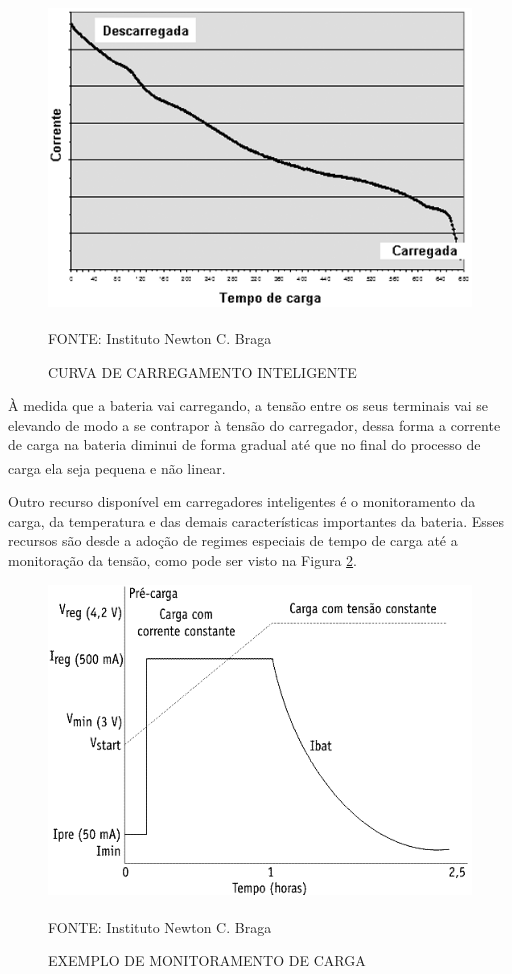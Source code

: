\documentclass[
	12pt,				%
	openright,			%
	oneside,			%
	a4paper,			%
	english,			%
	french,				%
	spanish,			%
	brazil,				%
	oldfontcommands
	]{abntex2}
\begin{document}
	\begin{figure}[th]
		\caption{CURVA DE CARREGAMENTO INTELIGENTE}
		\label{Fig_Temp_Carg}
		\centering
		\includegraphics[width=0.67\linewidth]{./figs/temp_carg}
			
		\begin{small}
			FONTE: Instituto Newton C. Braga\textsuperscript{\cite{carregador}}
		\end{small}	
	\end{figure}
	\pagebreak

	À medida que a bateria vai carregando, a tensão entre os seus terminais vai se elevando de modo a se contrapor à tensão do carregador, dessa forma a corrente de carga na bateria diminui de forma gradual até que no final do processo de carga ela seja pequena e não linear.\textsuperscript{\cite{carregador}}
	
	Outro recurso disponível em carregadores inteligentes é o monitoramento da carga, da temperatura e das demais características importantes da bateria. Esses recursos são desde a adoção de regimes especiais de tempo de carga até a monitoração da tensão, como pode ser visto na Figura \ref{Fig_Bat_Monit}.

	\begin{figure}[th]
		\caption{EXEMPLO DE MONITORAMENTO DE CARGA}
		\label{Fig_Bat_Monit}
		\centering
		\includegraphics[width=0.67\linewidth]{./figs/bat_monit}
			
		\begin{small}
			FONTE: Instituto Newton C. Braga\textsuperscript{\cite{carregador}}
		\end{small}	
	\end{figure}
\end{document}

